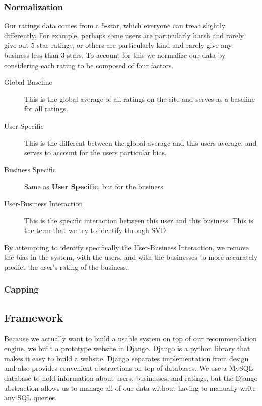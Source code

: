\subsubsection{Normalization}

Our ratings data comes from a 5-star, which everyone can treat slightly
differently.  For example, perhaps some users are particularly harsh and rarely
give out 5-star ratings, or others are particularly kind and rarely give any
business less than 3-stars. To account for this we normalize our data by
considering each rating to be composed of four factors.

\begin{description}

  \item[Global Baseline] This is the global average of all ratings on the site
and serves as a baseline for all ratings.

  \item[User Specific] This is the different between the global average and
this users average, and serves to account for the users particular bias.

  \item[Business Specific] Same as \textbf{User Specific}, but for the business

  \item[User-Business Interaction] This is the specific interaction between this
user and this business. This is the term that we try to identify through SVD. 

\end{description}

By attempting to identify specifically the User-Business Interaction, we remove
the bias in the system, with the users, and with the businesses to more
accurately predict the user's rating of the business. 

\subsubsection{Capping}


\subsection{Framework}

Because we actually want to build a usable system on top of our recommendation
engine, we built a prototype website in Django. Django is a python library that
makes it easy to build a website. Django separates implementation from design
and also provides convenient abstractions on top of databases. We use a MySQL
database to hold information about users, businesses, and ratings, but the
Django abstraction allows us to manage all of our data without having to
manually write any SQL queries.

